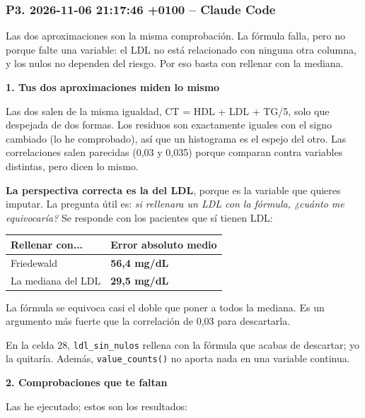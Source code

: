 \documentclass[11pt,a4paper]{article}
\begin{document}
\subsubsection*{P3. 2026-11-06 21:17:46 +0100 -- Claude Code}
{\small
Las dos aproximaciones son la misma comprobación. La fórmula falla, pero no porque falte una variable: el LDL no está relacionado con ninguna otra columna, y los nulos no dependen del riesgo. Por eso basta con rellenar con la mediana.

\smallskip\noindent\textbf{1. Tus dos aproximaciones miden lo mismo}\par
Las dos salen de la misma igualdad, CT = HDL + LDL + TG/\allowbreak{}5, solo que despejada de dos formas. Los residuos son exactamente iguales con el signo cambiado (lo he comprobado), así que un histograma es el espejo del otro. Las correlaciones salen parecidas (0,03 y 0,035) porque comparan contra variables distintas, pero dicen lo mismo.

\textbf{La perspectiva correcta es la del LDL}, porque es la variable que quieres imputar. La pregunta útil es: \textit{si rellenara un LDL con la fórmula, ¿cuánto me equivocaría?} Se responde con los pacientes que sí tienen LDL:

{\footnotesize\noindent\begin{tabularx}{\linewidth}{>{\raggedright\arraybackslash}X>{\raggedright\arraybackslash}X}
\toprule
\textbf{Rellenar con...} & \textbf{Error absoluto medio} \\
\midrule
Friedewald & \textbf{56,4 mg/\allowbreak{}dL} \\
La mediana del LDL & \textbf{29,5 mg/\allowbreak{}dL} \\
\bottomrule
\end{tabularx}}

La fórmula se equivoca casi el doble que poner a todos la mediana. Es un argumento más fuerte que la correlación de 0,03 para descartarla.

En la celda 28, \texttt{ldl\_\allowbreak{}sin\_\allowbreak{}nulos} rellena con la fórmula que acabas de descartar; yo la quitaría. Además, \texttt{value\_\allowbreak{}counts()} no aporta nada en una variable continua.

\smallskip\noindent\textbf{2. Comprobaciones que te faltan}\par
Las he ejecutado; estos son los resultados:

}
\end{document}
